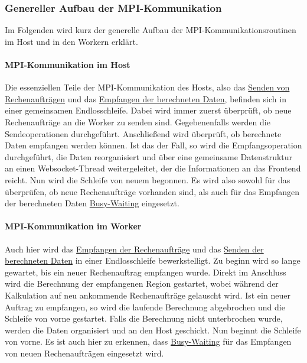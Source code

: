 \begin{figure}[h!]
	
\end{figure}

\subsubsection{Genereller Aufbau der MPI-Kommunikation}

Im Folgenden wird kurz der generelle Aufbau der MPI-Kommunikationsroutinen im Host und in den Workern erklärt.

\paragraph{MPI-Kommunikation im Host}\label{para:mpi_generell_host}

Die essenziellen Teile der MPI-Kommunikation des Hosts, also das \hyperref[para:send_host]{Senden von Rechenaufträgen} und das \hyperref[para:recv_host]{Empfangen der berechneten Daten}, befinden sich in einer gemeinsamen Endlosschleife. Dabei wird immer zuerst überprüft, ob neue Rechenaufträge an die Worker zu senden sind. Gegebenenfalls werden die Sendeoperationen durchgeführt. Anschließend wird überprüft, ob berechnete Daten empfangen werden können. Ist das der Fall, so wird die Empfangsoperation durchgeführt, die Daten reorganisiert und über eine gemeinsame Datenstruktur an einen Websocket-Thread weitergeleitet, der die Informationen an das Frontend reicht. Nun wird die Schleife von neuem begonnen.
Es wird also sowohl für das überprüfen, ob neue Rechenaufträge vorhanden sind, als auch für das Empfangen der berechneten Daten \hyperref[para:mpi_busy_waiting]{Busy-Waiting} eingesetzt.

\paragraph{MPI-Kommunikation im Worker}\label{para:mpi_generell_worker}

Auch hier wird das \hyperref[para:recv_worker]{Empfangen der Rechenaufträge} und das \hyperref[para:send_worker]{Senden der berechneten Daten} in einer Endlosschleife bewerkstelligt. Zu beginn wird so lange gewartet, bis ein neuer Rechenauftrag empfangen wurde. Direkt im Anschluss wird die Berechnung der empfangenen Region gestartet, wobei während der Kalkulation auf neu ankommende Rechenaufträge gelauscht wird. Ist ein neuer Auftrag zu empfangen, so wird die laufende Berechnung abgebrochen und die Schleife von vorne gestartet. Falls die Berechnung nicht unterbrochen wurde, werden die Daten organisiert und an den Host geschickt. Nun beginnt die Schleife von vorne.
Es ist auch hier zu erkennen, dass \hyperref[para:mpi_busy_waiting]{Busy-Waiting} für das Empfangen von neuen Rechenaufträgen eingesetzt wird.

